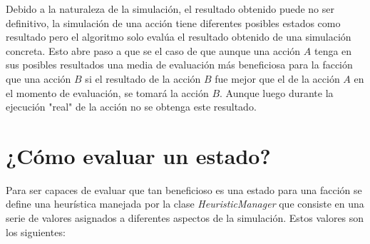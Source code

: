 \documentclass{llncs}
\begin{document}
Debido a la naturaleza de la simulaci\'on, el resultado obtenido puede no ser definitivo, la simulaci\'on de una acci\'on tiene diferentes posibles estados como resultado pero el algoritmo solo eval\'ua el resultado obtenido de una simulaci\'on
 concreta. Esto abre paso a que se el caso de que aunque una acci\'on $A$ tenga en sus posibles resultados una media de evaluaci\'on m\'as beneficiosa para la facci\'on que una acci\'on $B$ si el resultado de la acci\'on $B$ fue mejor que el de la acci\'on $A$ en el momento de evaluaci\'on, se tomar\'a la acci\'on $B$. Aunque luego durante la ejecuci\'on "real" de la acci\'on no se obtenga este resultado.

\section{¿C\'omo evaluar un estado?}

Para ser capaces de evaluar que tan beneficioso es una estado para una facci\'on se define una heur\'istica manejada por la clase \emph{HeuristicManager} que consiste en una serie de valores asignados a diferentes aspectos de la simulaci\'on. Estos valores son los siguientes:
\end{document}
